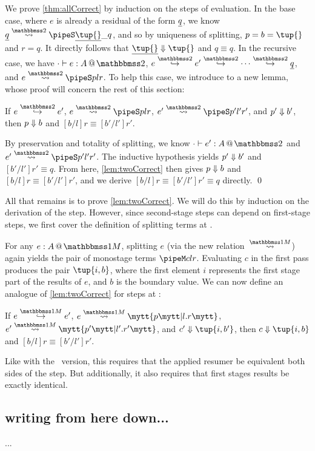 \begin{abstrsyn}
We prove \ref{thm:allCorrect} by induction on the steps of evaluation.  
In the base case, where $e$ is already a residual of the form $\underline{q}$, we know
$\splittwo {\exv q} A {\exv{\tup{}}} \_ q$, and so by uniqueness of splitting, 
$p = b = \tup{}$ and $r = q$.
It directly follows that $\reduce {\exv {\tup {}}} {\tup {}}$ and $q \equiv q$.
In the recursive case, we have 
$\typestwo [\cdot] e A$, $e \stepsym \bbtwo e' \stepsym \bbtwo \cdots \stepsym \bbtwo \exv q$, and $\splittwo e A p l r$.
To help this case, we introduce to a new lemma, whose proof will concern the rest of this section:
\begin{lemma}
\label{lem:twoCorrect}
If $e \stepsym \bbtwo e'$, $\splittwo e A p  l r$, $\splittwo {e'} A {p'} {l'} {r'}$, and ${p'} \Downarrow {b'}$,
then ${p} \Downarrow {b}$ and $[b/l]r \equiv [b'/l']r'$.
\end{lemma}
By preservation and totality of splitting, we know $\typestwo [\cdot] {e'} A$ and $\splittwo {e'} A {p'} {l'} {r'}$.
The inductive hypothesis yields ${p'} \Downarrow {b'}$ and $[b'/l']r' \equiv q$.
From here, \ref{lem:twoCorrect} then gives ${p} \Downarrow {b}$ and $[b/l]r \equiv [b'/l']r'$,
and we derive $[b/l]r \equiv [b'/l']r' \equiv q$ directly. \qed

All that remains is to prove \ref{lem:twoCorrect}.  
We will do this by induction on the derivation of the step.
However, since second-stage steps can depend on first-stage steps,
we first cover the definition of splitting terms at \bbonem.

For any $\colmix e A$, 
splitting $e$ (via the new relation~$\splitonesym$) again 
yields the pair of monostage terms $\pipeM c l r$. 
Evaluating $c$ in the first pass produces the pair
$\tup{i,b}$, where the first element $i$ represents the first stage part of the results of $e$,
and $b$ is the boundary value.
We can now define an analogue of \ref{lem:twoCorrect} for steps at \bbonem:
\begin{lemma}
\label{lem:oneCorrect}
If $e \stepsym \bbonem e'$, $\splitone e A p {l.r}$, $\splitone {e'} A {p'} {l'.r'}$, and $\reduce {c'} {\tup{i,b'}}$,
then $\reduce c {\tup {i,b}}$ and $[b/l]r \equiv [b'/l']r'$.
\end{lemma}
Like with the \bbtwo\ version, this requires that the applied resumer be equivalent both sides of the step.
But additionally, it also requires that first stages results be exactly identical.


\subsection{writing from here down...}
...


\end{abstrsyn}
